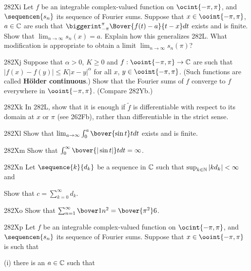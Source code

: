 {\spheader 282Xi Let $f$ be an integrable complex-valued function
on $\ocint{-\pi,\pi}$, and $\sequencen{s_n}$ its sequence of Fourier
sums.   Suppose that $x\in\ooint{-\pi,\pi}$, $a\in\Bbb C$ are such that
$\biggerint_{-\pi}^{\pi}\Bover{f(t)-a}{t-x}dt$ exists and is finite.
Show that $\lim_{n\to\infty}s_n(x)=a$.
Explain how this generalizes 282L.   What modification is appropriate to
obtain a limit $\lim_{n\to\infty}s_n(\pi)$?

\spheader 282Xj Suppose that $\alpha>0$, $K\ge 0$ and
$f:\ooint{-\pi,\pi}\to\Bbb C$ are such that
$|f(x)-f(y)|\le K|x-y|^{\alpha}$ for all $x$, $y\in\ooint{-\pi,\pi}$.
(Such functions are called {\bf H\"older continuous}.)
Show that the Fourier sums of $f$ converge to $f$ everywhere in
$\ooint{-\pi,\pi}$.     (Compare 282Yb.)

\spheader 282Xk In 282L, show that it is enough if $\tilde f$ is
differentiable with respect to its domain at $x$ or $\pi$ (see 262Fb),
rather than differentiable in the strict sense.

\spheader 282Xl Show that $\lim_{a\to\infty}\int_0^a\bover{\sin t}tdt$
exists and is finite.   
%

\spheader 282Xm Show that
$\int_0^{\infty}\bover{|\sin t|}tdt=\infty$.   

\sqheader 282Xn Let $\sequence{k}{d_k}$ be a sequence in $\Bbb C$ such
that $\sup_{k\in\Bbb N}|kd_k|<\infty$ and


\noindent Show that $c=\sum_{k=0}^{\infty}d_k$.   

\sqheader 282Xo Show that
$\sum_{n=1}^{\infty}\bover1{n^2}=\bover{\pi^2}6$.   

\spheader 282Xp Let $f$ be an integrable
complex-valued function on $\ocint{-\pi,\pi}$, and $\sequencen{s_n}$ its
sequence of Fourier sums.    Suppose that $x\in\ooint{-\pi,\pi}$ is such
that

(i) there is an $a\in\Bbb C$ such that



}
